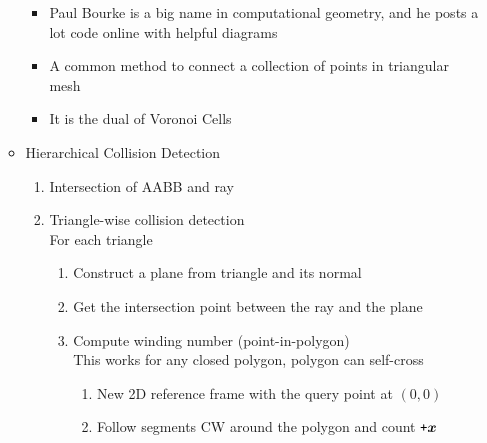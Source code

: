 \documentclass{hw_grad}
\begin{document}
\begin{enumerate}
\begin{itemize}
\begin{itemize}
				\item Paul Bourke is a big name in computational geometry, and he posts a lot code online with helpful diagrams
				\item A common method to connect a collection of points in triangular mesh
				\item It is the dual of Voronoi Cells
			\end{itemize}
			\item Hierarchical Collision Detection
			\begin{enumerate}
				\item Intersection of AABB and ray
				\item Triangle-wise collision detection \\
				For each triangle
				\begin{enumerate}
					\item Construct a plane from triangle and its normal
					\item Get the intersection point between the ray and the plane
					\item Compute winding number (point-in-polygon) \\
					This works for any closed polygon, polygon can self-cross
					\begin{enumerate}
						\item New 2D reference frame with the query point at $\left( 0 , 0 \right)$ 
						\item Follow segments CW around the polygon and count $ \texttt{+} \hbox{\boldmath$x$} $
					\end{enumerate}
				\end{enumerate}
			\end{enumerate}
		\end{itemize}
	\end{enumerate}
	
	
	
\end{document}
